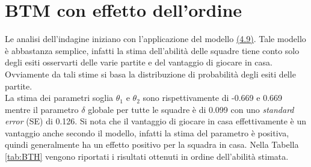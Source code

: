 \section{BTM con effetto dell'ordine}
Le analisi dell'indagine iniziano con l'applicazione del modello \hyperref[for:3.9]{(4.9)}. Tale modello è abbastanza semplice, infatti la stima dell'abilità delle squadre tiene conto solo degli esiti osservarti delle varie partite e del vantaggio di giocare in casa. Ovviamente da tali stime si basa la distribuzione di probabilità degli esiti delle partite.\\
La stima dei parametri soglia $\theta_1$ e $\theta_2$ sono rispettivamente di -0.669 e 0.669 mentre il parametro $\delta$ globale per tutte le squadre è di 0.099 con uno \emph{standard error} (SE) di 0.126. Si nota che il vantaggio di giocare in casa effettivamente è un vantaggio anche secondo il modello, infatti la stima del parametro è positiva, quindi generalmente ha un effetto positivo per la squadra in casa. Nella Tabella \ref{tab:BTH} vengono riportati i risultati ottenuti in ordine dell'abilità stimata.
